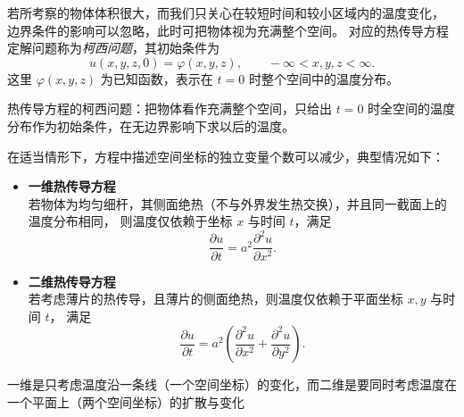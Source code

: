 \begin{definition}[热传导方程的柯西问题]
若所考察的物体体积很大，而我们只关心在较短时间和较小区域内的温度变化，
边界条件的影响可以忽略，此时可把物体视为充满整个空间。
对应的热传导方程定解问题称为\emph{柯西问题}，其初始条件为
\begin{equation}\label{eq:heat-cauchy}
u(x,y,z,0)=\varphi(x,y,z),\qquad -\infty<x,y,z<\infty. \tag{1.14}
\end{equation}
这里 $\varphi(x,y,z)$ 为已知函数，表示在 $t=0$ 时整个空间中的温度分布。
\end{definition}
\begin{note}
    热传导方程的柯西问题：把物体看作充满整个空间，只给出 $t=0$ 时全空间的温度分布作为初始条件，在无边界影响下求以后的温度。
\end{note}
\begin{theorem}[ 一维vs二维]
在适当情形下，方程中描述空间坐标的独立变量个数可以减少，典型情况如下：
\begin{itemize}
  \item[(1)] \textbf{一维热传导方程}\\
  若物体为均匀细杆，其侧面绝热（不与外界发生热交换），并且同一截面上的温度分布相同，
  则温度仅依赖于坐标 $x$ 与时间 $t$，满足
  \begin{equation}\label{eq:1d-heat}
    \frac{\partial u}{\partial t} = a^{2}\frac{\partial^{2}u}{\partial x^{2}}. \tag{1.15}
  \end{equation}

  \item[(2)] \textbf{二维热传导方程}\\
  若考虑薄片的热传导，且薄片的侧面绝热，则温度仅依赖于平面坐标 $x,y$ 与时间 $t$，
  满足
  \begin{equation}\label{eq:2d-heat}
    \frac{\partial u}{\partial t}
    = a^{2}\left(
        \frac{\partial^{2}u}{\partial x^{2}}
       +\frac{\partial^{2}u}{\partial y^{2}}
      \right). \tag{1.16}
  \end{equation}
\end{itemize}
\end{theorem}
\begin{note}
    一维是只考虑温度沿一条线（一个空间坐标）的变化，而二维是要同时考虑温度在一个平面上（两个空间坐标）的扩散与变化
\end{note}
